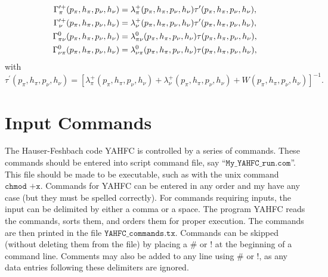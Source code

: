 \documentclass[
10pt,
showpacs,preprintnumbers,footinbib,
amsfonts,amsmath,amssymb,
aps,
prc,twocolumn,groupedaddress,superscriptaddress,
showkeys,
nofootinbib
]{revtex4-1}
\begin{document}
\begin{widetext}
\begin{align}
\Gamma_\pi^{\prime +}(p_\pi, h_\pi, p_\nu, h_\nu) & = \lambda_\pi^+(p_\pi, h_\pi, p_\nu, h_\nu) \tau^\prime(p_\pi, h_\pi, p_\nu, h_\nu), \notag \\
\Gamma_\nu^{\prime +}(p_\pi, h_\pi, p_\nu, h_\nu) & = \lambda_\nu^+(p_\pi, h_\pi, p_\nu, h_\nu) \tau^\prime(p_\pi, h_\pi, p_\nu, h_\nu), \notag \\
\Gamma^0_{\pi\nu}(p_\pi, h_\pi, p_\nu, h_\nu) & = \lambda_{\pi\nu}^0(p_\pi, h_\pi, p_\nu, h_\nu) \tau(p_\pi, h_\pi, p_\nu, h_\nu), \notag \\
\Gamma^0_{\nu\pi}(p_\pi, h_\pi, p_\nu, h_\nu) & = \lambda_{\nu\pi}^0(p_\pi, h_\pi, p_\nu, h_\nu) \tau(p_\pi, h_\pi, p_\nu, h_\nu),
\end{align}
with
\begin{equation}
\tau^\prime(p_\pi, h_\pi, p_\nu, h_\nu) = \left [ \lambda_\pi^+(p_\pi, h_\pi, p_\nu, h_\nu) + \lambda_\nu^+(p_\pi, h_\pi, p_\nu, h_\nu) + 
                                                                        W(p_\pi, h_\pi, p_\nu, h_\nu) \right ]^{-1}.
\end{equation}

\end{widetext}


\section{Input Commands}
\label{App:Commands}
The Hauser-Feshbach code YAHFC is controlled by a series of commands. These commands should be entered into script command file, say ``${\texttt{My\_YAHFC\_run.com}}$''. This file should be made to be executable, such as with the unix command ${\texttt{chmod +x}}$. Commands for YAHFC can be entered in any order and my have any case (but they must be spelled correctly). For commands requiring inputs, the input can be delimited by either a comma or a space. The program YAHFC reads the commands, sorts them, and orders them for proper execution. The commands are then printed in the file 
${\texttt{YAHFC\_commands.tx}}$. Commands can be skipped (without deleting them from the file) by placing a \# or ! at the beginning of a command line. Comments may also be added to any line using \# or !, as any data entries following these delimiters are ignored. 
\end{document}

